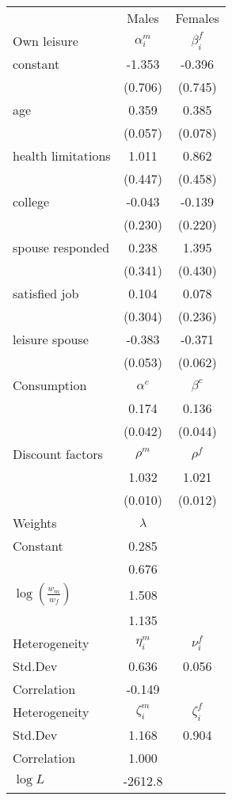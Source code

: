 \begin{tabular}{lcc} 
\hline\hline 
 & Males & Females \\ 
Own leisure & $\alpha_{i}^{m}$ & $\beta_{i}^{f}$ \\ 
constant & -1.353 & -0.396 \\ 
 & (0.706) & (0.745) \\ 
age & 0.359 & 0.385 \\ 
 & (0.057) & (0.078) \\ 
health limitations & 1.011 & 0.862 \\ 
 & (0.447) & (0.458) \\ 
college & -0.043 & -0.139 \\ 
 & (0.230) & (0.220) \\ 
spouse responded & 0.238 & 1.395 \\ 
 & (0.341) & (0.430) \\ 
satisfied job & 0.104 & 0.078 \\ 
 & (0.304) & (0.236) \\ 
leisure spouse & -0.383 & -0.371 \\ 
 & (0.053) & (0.062) \\ 
Consumption & $\alpha^{c}$ & $\beta^{c}$ \\ 
 & 0.174 & 0.136 \\ 
 & (0.042) & (0.044) \\ 
Discount factors & $\rho^m$ & $\rho^f$ \\ 
 & 1.032 & 1.021 \\ 
 & (0.010) & (0.012) \\ 
Weights & $\lambda$ &  \\ 
Constant & 0.285 &  \\ 
 & 0.676 &  \\ 
$\log(\frac{w_m}{w_f})$ & 1.508 &  \\ 
 & 1.135 &  \\ 
Heterogeneity & $\eta_i^m$ & $\nu_i^f$ \\ 
Std.Dev & 0.636 & 0.056 \\ 
Correlation & -0.149 &  \\ 
Heterogeneity & $\zeta_i^m$ & $\zeta_i^f$ \\ 
Std.Dev & 1.168 & 0.904 \\ 
Correlation & 1.000 &  \\ 
\hline 
$\log L$ & -2612.8 & \\ 
\hline \hline 
\end{tabular} 
